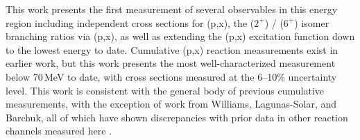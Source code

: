 This work presents the first measurement of several observables in this energy region including independent cross sections for      (p,x),   the   ($2^+$) /   ($6^+$)   isomer branching ratios via (p,x),  as well as extending the (p,x) excitation function down to the lowest energy to date. 
Cumulative  (p,x) reaction measurements exist in earlier work, but  this work presents the most well-characterized measurement  below 70\,MeV to date, with cross sections measured  at the 6--10\% uncertainty level.
This work is consistent with the general body of previous cumulative  measurements, with the exception of work from Williams, Lagunas-Solar, and Barchuk, all of which have shown discrepancies with prior data in other reaction channels measured here \cite{barchuk1987excitation,Lagunas-Solar1979a,PhysRev.162.1055}.


